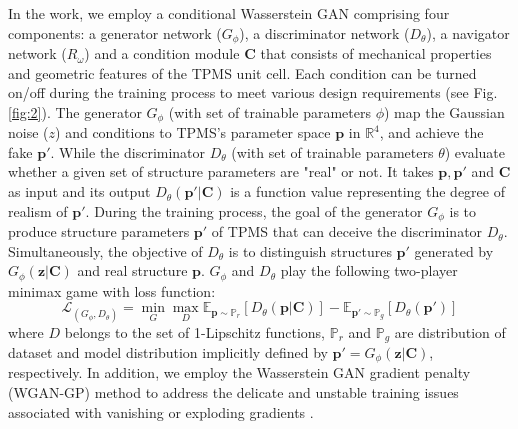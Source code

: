 \documentclass[preprint,review,12pt,authoryear]{elsarticle}
\begin{document}
In the work, we employ a conditional Wasserstein GAN comprising four components: a generator network ($G_\phi$), a discriminator network ($D_\theta$),  a navigator network ($R_\omega$) and a condition module $\boldsymbol{C}$ that consists of mechanical properties and geometric features of the TPMS unit cell. Each condition can be turned on/off during the training process to meet various design requirements (see Fig. \ref{fig:2}). The generator $G_\phi$ (with set of trainable parameters $\phi$) map the Gaussian noise ($z$) and conditions to TPMS's parameter space $\boldsymbol{p}$ in $\mathbb{R}^4$, and achieve the fake $\boldsymbol{p}'$. While the discriminator $D_\theta$ (with set of trainable parameters $\theta$) evaluate whether a given set of structure parameters are "real" or not. It takes $\boldsymbol{p},\boldsymbol{p}'$ and  $\boldsymbol{C}$ as input and its output $D_\theta(\boldsymbol{p}'|\boldsymbol{C})$ is a function value representing the degree of realism of $\boldsymbol{p}'$. During the training process, the goal of the generator $G_\phi$ is to produce structure parameters $\boldsymbol{p}'$ of TPMS that can deceive the discriminator $D_\theta$. Simultaneously, the objective of $D_\theta$ is to distinguish structures $\boldsymbol{p}'$ generated by $G_\phi(\boldsymbol{z}|\boldsymbol{C})$ and real structure $\boldsymbol{p}$. $G_\phi$ and $D_\theta$ play the following two-player minimax game with loss function:
\begin{equation}
\mathcal{L}_{(G_\phi, D_\theta)}= \min_G \max_{D} \mathbb{E}_{\boldsymbol{p} \sim \mathbb{P}_r} \left[ D_\theta(\boldsymbol{p}|\boldsymbol{C}) \right] - \mathbb{E}_{\boldsymbol{p}' \sim \mathbb{P}_g} \left[ D_\theta (\boldsymbol{p}') \right]
\label{eq:7}
\end{equation}
where $D$ belongs to the set of 1-Lipschitz functions, $\mathbb{P}_r$ and $\mathbb{P}_g$ are distribution of dataset and model distribution implicitly defined by $\boldsymbol{p}'=G_\phi(\boldsymbol{z}|\boldsymbol{C}) $, respectively. In addition, we employ the Wasserstein GAN gradient penalty (WGAN-GP) method to address the delicate and unstable training issues associated with vanishing or exploding gradients \citep{Gulrajani2017}.
\end{document}
